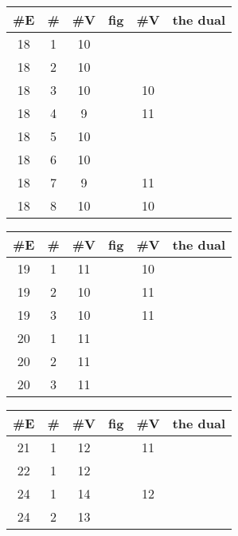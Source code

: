 \documentclass{amsart}
\begin{document}
\begin{table}[ht]
     \begin{tabular}{|c|c|c|c || c|c|}
      \#E & \# & \#V & fig &  \#V &the dual\\
\hline
18 & 1 & 10  &    \\%
18 & 2 & 10  &    \\%
18 & 3 & 10  &   &%
         10  &    \\%
18 & 4 & 9   &  &%
         11  &    \\%
18 & 5 & 10  &    \\%
18 & 6 & 10  &    \\%
18 & 7 & 9   &  &%
         11  &    \\%
18 & 8 & 10  &   &%
         10  &    \\%
\end{tabular}
\end{table}
\begin{table}[ht]
     \begin{tabular}{|c|c|c|c || c|c|}
      \#E & \# & \#V & fig & \#V &the dual\\
\hline
19 & 1 & 11  &   &%
         10  &    \\%
19 & 2 & 10  &   &%
         11  &    \\%
19 & 3 & 10  &   &%
         11  &    \\%
20 & 1 & 11  &    \\%
20 & 2 & 11  &    \\%
20 & 3 & 11  &    \\%
\end{tabular}
\end{table}
\begin{table}[ht]
     \begin{tabular}{|c|c|c|c || c|c|}
      \#E & \# & \#V & fig & \#V &the dual\\
\hline
21 & 1 & 12  &   &%
         11  &    \\%
22 & 1 & 12 &   \\%
24 & 1 & 14 &    &%
         12 &       \\%
24 & 2 & 13  &    \\%
     \end{tabular}
\end{table}
\end{document}
